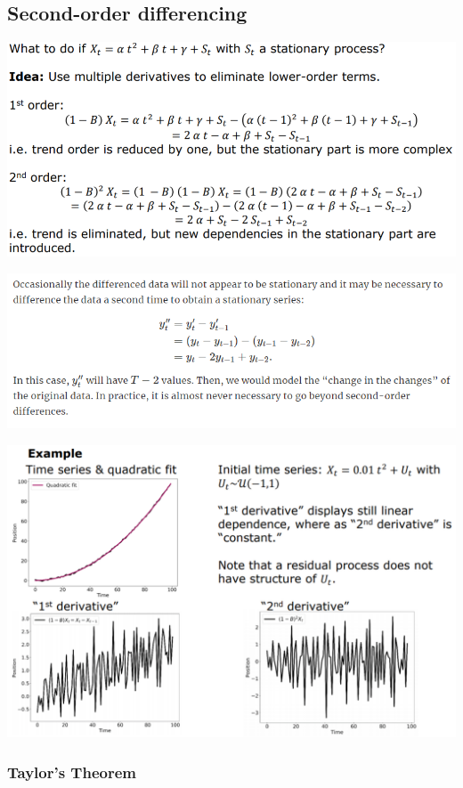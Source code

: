 \documentclass[
]{article}
\begin{document}
\hypertarget{second-order-differencing}{%
\subsection{Second-order differencing}\label{second-order-differencing}}

\includegraphics[width=1\linewidth]{2nd_derivative}

\includegraphics[width=1\linewidth]{diff_2}

\includegraphics[width=1\linewidth]{2nd}

\hypertarget{taylors-theorem}{%
\subsubsection{Taylor's Theorem}\label{taylors-theorem}}
\end{document}
